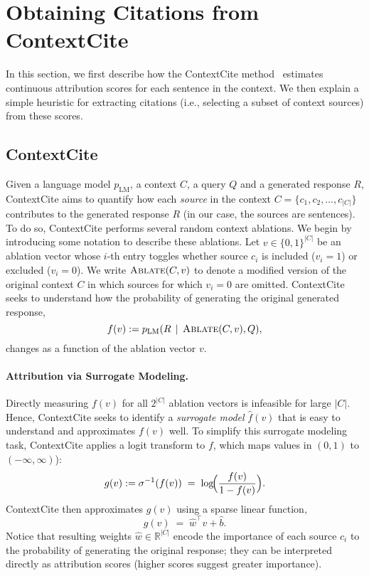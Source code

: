 \section{Obtaining Citations from ContextCite}
\label{appx:cc}

In this section, we first describe how the ContextCite method~\citep{cohen2024contextcite} estimates continuous attribution scores for each sentence in the context. We then explain a simple heuristic for extracting citations (i.e., selecting a subset of context sources) from these scores.

\subsection{ContextCite}

Given a language model $p_\text{LM}$, a context $C$, a query $Q$ and a generated response $R$, ContextCite aims to quantify how each \emph{source} in the context $C = \{c_1, c_2, \dots, c_{|C|}\}$ contributes to the generated response $R$ (in our case, the sources are sentences). 
To do so, ContextCite performs several random context ablations.
We begin by introducing some notation to describe these ablations.
Let $v \in \{0,1\}^{|C|}$ be an ablation vector whose $i$-th entry toggles whether source $c_i$ is included ($v_i=1$) or excluded ($v_i=0$).
We write $\textsc{Ablate}(C,v)$ to denote a modified version of the original context $C$ in which sources for which $v_i=0$ are omitted.
ContextCite seeks to understand how the probability of generating the original generated response,
\[
f(v) := p_\text{LM}(R \,\mid\, \textsc{Ablate}(C, v), Q),
\]
changes as a function of the ablation vector $v$.

\paragraph{Attribution via Surrogate Modeling.}
Directly measuring $f(v)$ for all $2^{|C|}$ ablation vectors is infeasible for large $|C|$.
Hence, ContextCite seeks to identify a \textit{surrogate model} $\hat{f}(v)$ that is easy to understand and approximates $f(v)$ well.
To simplify this surrogate modeling task, ContextCite applies a logit transform to $f$, which maps values in $(0,1)$ to $(-\infty,\infty)$):
\[
g(v) := \sigma^{-1}(f(v)) \;=\; \log\!\Bigl(\frac{f(v)}{1 - f(v)}\Bigr).
\]
ContextCite then approximates $g(v)$ using a sparse linear function,
\[
\hat{g}(v) \;=\; \hat{w}^\top v + \hat{b}.
\]
Notice that resulting weights $\hat{w} \in \mathbb{R}^{|C|}$ encode the importance of each source $c_i$ to the probability of generating the original response;
they can be interpreted directly as attribution scores (higher scores suggest greater importance).


